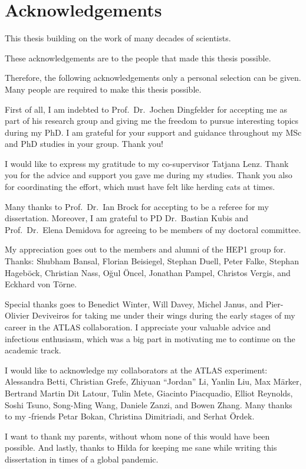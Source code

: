 \chapter*{Acknowledgements}


This thesis building on the work of many decades of scientists.

These acknowledgements are to the people that made this thesis possible.

Therefore, the following acknowledgements only a personal selection can be
given. Many people are required to make this thesis possible.

First of all, I am indebted to Prof.\ Dr.\ Jochen Dingfelder for accepting me as
part of his research group and giving me the freedom to pursue interesting
topics during my PhD. I am grateful for your support and guidance throughout my
MSc and PhD studies in your group. Thank you!

I would like to express my gratitude to my co-supervisor Tatjana Lenz. Thank you
for the advice and support you gave me during my studies. Thank you also for
coordinating the \bbtautau effort, which must have felt like herding cats at
times.

Many thanks to Prof.\ Dr.\ Ian Brock for accepting to be a referee for my
dissertation. Moreover, I am grateful to PD Dr.\ Bastian Kubis and Prof.\ Dr.\
Elena Demidova for agreeing to be members of my doctoral committee.

My appreciation goes out to the members and alumni of the \textsc{HEP1} group
for. Thanks: Shubham Bansal, Florian Beisiegel, Stephan Duell, Peter Falke,
Stephan Hageböck, Christian Nass, Oğul Öncel, Jonathan Pampel, Christos Vergis,
and Eckhard von Törne.

Special thanks goes to Benedict Winter, Will Davey, Michel Janus, and
Pier-Olivier Deviveiros for taking me under their wings during the early stages
of my career in the ATLAS collaboration. I appreciate your valuable advice and
infectious enthusiasm, which was a big part in motivating me to continue on the
academic track.

I would like to acknowledge my collaborators at the ATLAS experiment: Alessandra
Betti, Christian Grefe, Zhiyuan ``Jordan'' Li, Yanlin Liu, Max Märker, Bertrand
Martin Dit Latour, Tulin Mete, Giacinto Piacquadio, Elliot Reynolds, Soshi
Tsuno, Song-Ming Wang, Daniele Zanzi, and Bowen Zhang. Many thanks to my
\bbtautau-friends Petar Bokan, Christina Dimitriadi, and Serhat Ördek.

I want to thank my parents, without whom none of this would have been
possible. And lastly, thanks to Hilda for keeping me sane while writing this
dissertation in times of a global pandemic.


